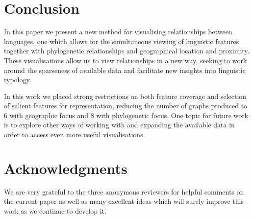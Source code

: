 \documentclass[11pt]{article}
\begin{document}
%
%
%


\section{Conclusion}
In this paper we present a new method for visualising relationships between languages, one which allows for the simultaneous viewing of linguistic features together with phylogenetic relationships and geographical location and proximity. These visualisations allow us to view relationships in a new way, seeking to work around the sparseness of available data and facilitate new insights into linguistic typology.

In this work we placed strong restrictions on both feature coverage and selection of salient features for representation, reducing the number of graphs produced to 6 with geographic focus and 8 with phylogenetic focus. One topic for future work is to explore other ways of working with and expanding the available data in order to access even more useful visualisations.

\section*{Acknowledgments}
We are very grateful to the three anonymous reviewers for helpful comments on the current paper as well as many excellent ideas which will surely improve this work as we continue to develop it. 



\end{document}
